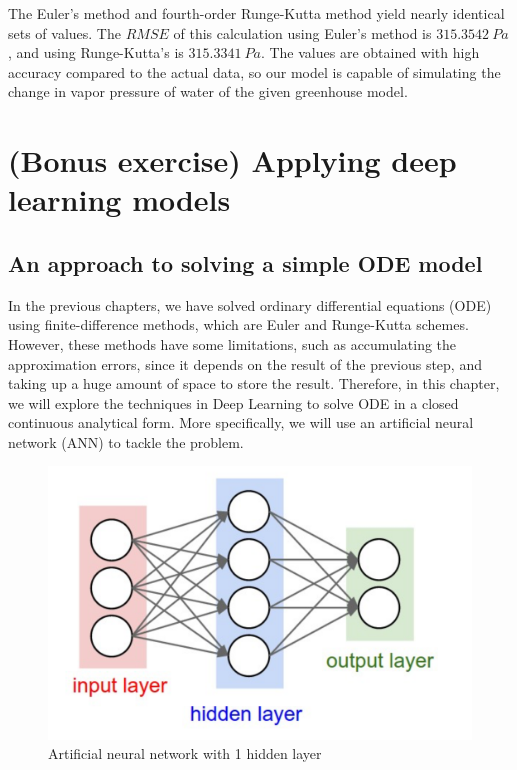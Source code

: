 \documentclass[a4paper]{article}
\numberwithin{equation}{section}
\begin{document}
The Euler's method and fourth-order Runge-Kutta method yield nearly identical sets of values. The \( RMSE \) of this calculation using Euler's method is \( 315.3542\ Pa \), and using Runge-Kutta's is \( 315.3341\ Pa \). The values are obtained with high accuracy compared to the actual data, so our model is capable of simulating the change in vapor pressure of water of the given greenhouse model.

\newpage
\section{(Bonus exercise) Applying deep learning models}
\subsection{An approach to solving a simple ODE model}
In the previous chapters, we have solved ordinary differential equations (ODE) using finite-difference methods, which are Euler and Runge-Kutta schemes. However, these methods have some limitations, such as accumulating the approximation errors, since it depends on the result of the previous step, and taking up a huge amount of space to store the result. Therefore, in this chapter, we will explore the techniques in Deep Learning to solve ODE in a closed continuous analytical form. More specifically, we will use an artificial neural network (ANN) to tackle the problem.

\begin{figure}[H]
  \centering
  \includegraphics[width=\textwidth]{nn.png}
  \caption{Artificial neural network with 1 hidden layer}
\end{figure}
\end{document}
